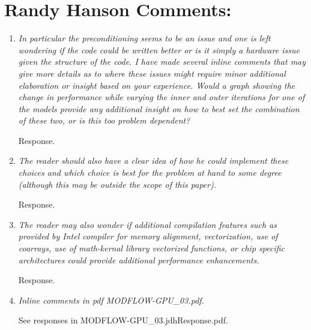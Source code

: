 \documentclass[12pt]{article} %
\begin{document}
\section*{\small{Randy Hanson Comments:}}
\begin{enumerate}
\item \textit{In particular the preconditioning seems to be an issue and one is left wondering if the code could be written better or is it simply a hardware issue given the structure of the code. I have made several inline comments that may give more details as to where these issues might require minor additional elaboration or insight based on your experience. Would a graph showing the change in performance while varying the inner and outer iterations for one of the models provide any additional insight on how to best set the combination of these two, or is this too problem dependent?} 

Response. 

\item \textit{The reader should also have a clear idea of how he could implement these choices and which choice is best for the problem at hand to some degree (although this may be outside the scope of this paper).} 

Response. 

\item \textit{The reader may also wonder if additional compilation features such as provided by Intel compiler for memory alignment, vectorization, use of coarrays, use of math-kernal library vectorized functions, or chip specific architectures could provide additional performance enhancements.} 

Response. 

\item \textit{Inline comments in pdf  MODFLOW-GPU\_03.pdf.} 

See responses in MODFLOW-GPU\_03.jdhResponse.pdf.

\end{enumerate}
\end{document}
